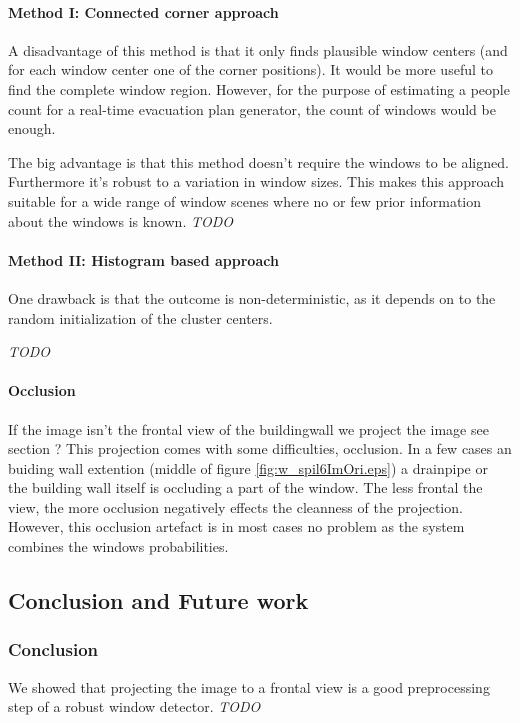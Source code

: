 \paragraph{Method I: Connected corner approach} 
A disadvantage of this method is that it only finds plausible window centers
(and for each window center one of the corner positions).  It would be more
useful to find the complete window region. However, for the purpose of estimating
a people count for a real-time evacuation plan generator, the count of windows
would be enough.

The big advantage is that this method doesn't require the windows to be aligned.
Furthermore it's robust to a variation in window sizes. This makes this approach suitable
for a wide range of window scenes where no or few prior information about the
	windows is known.
\emph{TODO}


\paragraph{Method II: Histogram based approach} 
One drawback is that the outcome is non-deterministic, as it depends on to the
random initialization of the cluster centers.

\emph{TODO}\\

\paragraph{Occlusion}
\label{lab:occlusion}
If the image isn't the frontal view of the buildingwall we project the image 
see section ?%
This projection comes with some difficulties, occlusion.  In a few cases an
buiding wall extention (middle of figure \ref{fig:w_spil6ImOri.eps}) a drainpipe
or the building wall itself is occluding a part of the window.  The less frontal
the view, the more occlusion negatively effects the cleanness of the projection.
However, this occlusion artefact is in most cases no problem as the system
combines the windows probabilities.  

\subsection{Conclusion and Future work}
\subsubsection{Conclusion}
We showed that projecting the image to a frontal view is a good preprocessing
step of a robust window detector.
\emph{TODO}

